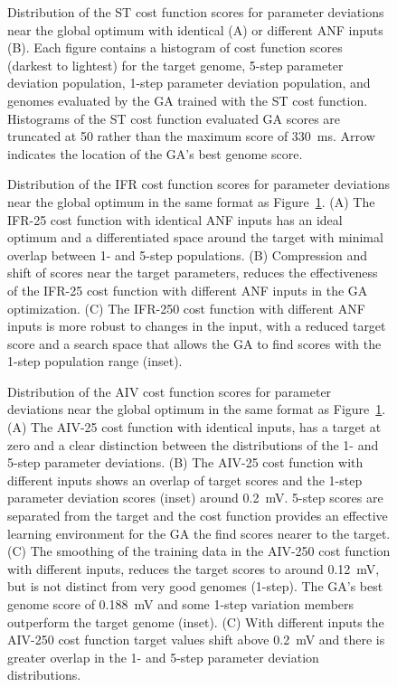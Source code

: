   \begin{figure}[htb]
    \centering
    \caption{Distribution of the ST cost function scores for parameter
      deviations near the global optimum with identical (A) or
      different ANF inputs (B). Each figure contains a histogram of
      cost function scores (darkest to lightest) for the target
      genome, 5-step parameter deviation population, 1-step parameter
      deviation population, and genomes evaluated by the GA trained
      with the ST cost function.  Histograms of the ST cost function
      evaluated GA scores are truncated at 50 rather than the maximum
      score of 330~ms.  Arrow indicates the location of the GA's best
      genome score.}
    \label{fig:GA:9}
  \end{figure}



  \begin{figure}[htb]
    \centering

    \caption{Distribution of the IFR cost function scores for
      parameter deviations near the global optimum in the same format
      as Figure~\ref{fig:GA:9}.  (A) The IFR-25 cost function with
      identical ANF inputs has an ideal optimum and a differentiated
      space around the target with minimal overlap between 1- and
      5-step populations. (B) Compression and shift of scores near the
      target parameters, reduces the effectiveness of the IFR-25 cost
      function with different ANF inputs in the GA optimization. (C)
      The IFR-250 cost function with different ANF inputs is more
      robust to changes in the input, with a reduced target score and
      a search space that allows the GA to find scores with the 1-step
      population range (inset).}
    \label{fig:GA:10}
  \end{figure}



  \begin{figure}[htb]
    \centering
    \caption{Distribution of the AIV cost function scores for
      parameter deviations near the global optimum in the same format
      as Figure~\ref{fig:GA:9}.  (A) The AIV-25 cost function with
      identical inputs, has a target at zero and a clear distinction
      between the distributions of the 1- and 5-step parameter
      deviations.  (B) The AIV-25 cost function with different inputs
      shows an overlap of target scores and the 1-step parameter
      deviation scores (inset) around 0.2~mV. 5-step scores are
      separated from the target and the cost function provides an
      effective learning environment for the GA the find scores nearer
      to the target. (C) The smoothing of the training data in the
      AIV-250 cost function with different inputs, reduces the target
      scores to around 0.12~mV, but is not distinct from very good
      genomes (1-step). The GA's best genome score of 0.188~mV and
      some 1-step variation members outperform the target genome
      (inset). (C) With different inputs the AIV-250 cost function
      target values shift above 0.2~mV and there is greater overlap in
      the 1- and 5-step parameter deviation distributions.}
    \label{fig:GA:11}
  \end{figure}


